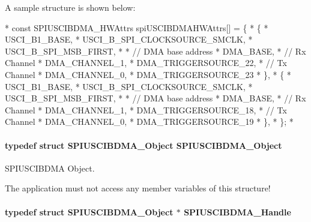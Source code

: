 A sample structure is shown below\-: 
\begin{DoxyCode}
*  \textcolor{keyword}{const} SPIUSCIBDMA_HWAttrs spiUSCIBDMAHWAttrs[] = \{
*      \{
*          USCI\_B1\_BASE,
*          USCI\_B\_SPI\_CLOCKSOURCE\_SMCLK,
*          USCI\_B\_SPI\_MSB\_FIRST,
*
*          \textcolor{comment}{// DMA base address}
*          DMA\_BASE,
*          \textcolor{comment}{// Rx Channel}
*          DMA\_CHANNEL\_1,
*          DMA\_TRIGGERSOURCE\_22,
*          \textcolor{comment}{// Tx Channel}
*          DMA\_CHANNEL\_0,
*          DMA\_TRIGGERSOURCE\_23
*      \},
*      \{
*          USCI\_B1\_BASE,
*          USCI\_B\_SPI\_CLOCKSOURCE\_SMCLK,
*          USCI\_B\_SPI\_MSB\_FIRST,
*
*          \textcolor{comment}{// DMA base address}
*          DMA\_BASE,
*          \textcolor{comment}{// Rx Channel}
*          DMA\_CHANNEL\_1,
*          DMA\_TRIGGERSOURCE\_18,
*          \textcolor{comment}{// Tx Channel}
*          DMA\_CHANNEL\_0,
*          DMA\_TRIGGERSOURCE\_19
*      \},
*  \};
*  
\end{DoxyCode}
\paragraph[{S\-P\-I\-U\-S\-C\-I\-B\-D\-M\-A\-\_\-\-Object}]{\setlength{\rightskip}{0pt plus 5cm}typedef struct {\bf S\-P\-I\-U\-S\-C\-I\-B\-D\-M\-A\-\_\-\-Object}  {\bf S\-P\-I\-U\-S\-C\-I\-B\-D\-M\-A\-\_\-\-Object}}\label{_s_p_i_u_s_c_i_b_d_m_a_8h_a0698c405d1ebd4309591999417fce4de}


S\-P\-I\-U\-S\-C\-I\-B\-D\-M\-A Object. 

The application must not access any member variables of this structure! 
\paragraph[{S\-P\-I\-U\-S\-C\-I\-B\-D\-M\-A\-\_\-\-Handle}]{\setlength{\rightskip}{0pt plus 5cm}typedef struct {\bf S\-P\-I\-U\-S\-C\-I\-B\-D\-M\-A\-\_\-\-Object} $\ast$ {\bf S\-P\-I\-U\-S\-C\-I\-B\-D\-M\-A\-\_\-\-Handle}}\label{_s_p_i_u_s_c_i_b_d_m_a_8h_afaf74400e5a3e7620329e3a03d072411}


